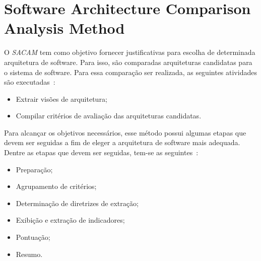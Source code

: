 \section{Software Architecture Comparison Analysis Method}

O \emph{\acrfull{SACAM}} tem como objetivo fornecer justificativas para escolha de determinada arquitetura de software. Para isso, são comparadas arquiteturas candidatas para o sistema de software. Para essa comparação ser realizada, as seguintes atividades são executadas~\cite{SACAM}:

\begin{itemize}
    \item Extrair visões de arquitetura;
    \item Compilar critérios de avaliação das arquiteturas candidatas.
\end{itemize}

Para alcançar os objetivos necessários, esse  método possui algumas etapas que devem ser seguidas a fim de eleger a  arquitetura de software mais adequada. Dentre as etapas que devem ser seguidas, tem-se as seguintes~\cite{SACAM}:

\begin{itemize}
    \item Preparação;
    \item Agrupamento de critérios;
    \item Determinação de diretrizes de extração;
    \item Exibição e extração de indicadores;
    \item Pontuação;
    \item Resumo.
\end{itemize}


